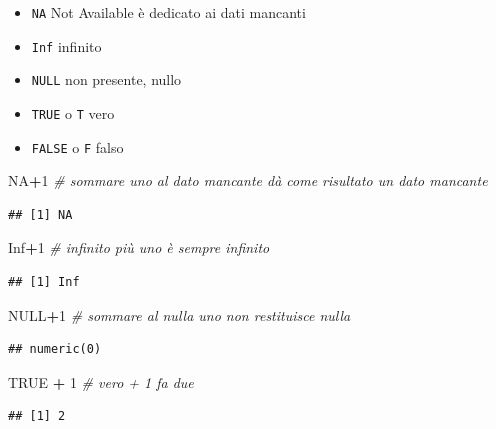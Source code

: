 \documentclass[
  11pt,
]{book}
\newenvironment{Shaded}{\begin{snugshade}}{\end{snugshade}}
\newcommand{\CommentTok}[1]{\textcolor[rgb]{0.56,0.35,0.01}{\textit{#1}}}
\newcommand{\ConstantTok}[1]{\textcolor[rgb]{0.56,0.35,0.01}{#1}}
\newcommand{\DecValTok}[1]{\textcolor[rgb]{0.00,0.00,0.81}{#1}}
\newcommand{\SpecialCharTok}[1]{\textcolor[rgb]{0.81,0.36,0.00}{\textbf{#1}}}
\providecommand{\tightlist}{%
  \setlength{\itemsep}{0pt}\setlength{\parskip}{0pt}}
\theoremstyle{mytheoremstyle}
\theoremstyle{mydefstyle}
\begin{document}
\begin{itemize}
\tightlist
\item
  \texttt{NA} Not Available è dedicato ai dati mancanti
\item
  \texttt{Inf} infinito
\item
  \texttt{NULL} non presente, nullo
\item
  \texttt{TRUE} o \texttt{T} vero
\item
  \texttt{FALSE} o \texttt{F} falso
\end{itemize}

\begin{Shaded}
\begin{Highlighting}[]
\ConstantTok{NA}\SpecialCharTok{+}\DecValTok{1}      \CommentTok{\# sommare uno al dato mancante dà come risultato un dato mancante}
\end{Highlighting}
\end{Shaded}

\begin{verbatim}
## [1] NA
\end{verbatim}

\begin{Shaded}
\begin{Highlighting}[]
\ConstantTok{Inf}\SpecialCharTok{+}\DecValTok{1}     \CommentTok{\# infinito più uno è sempre infinito}
\end{Highlighting}
\end{Shaded}

\begin{verbatim}
## [1] Inf
\end{verbatim}

\begin{Shaded}
\begin{Highlighting}[]
\ConstantTok{NULL}\SpecialCharTok{+}\DecValTok{1}    \CommentTok{\# sommare al nulla uno non restituisce nulla}
\end{Highlighting}
\end{Shaded}

\begin{verbatim}
## numeric(0)
\end{verbatim}

\begin{Shaded}
\begin{Highlighting}[]
\ConstantTok{TRUE} \SpecialCharTok{+} \DecValTok{1}  \CommentTok{\# vero + 1 fa due}
\end{Highlighting}
\end{Shaded}

\begin{verbatim}
## [1] 2
\end{verbatim}
\end{document}
